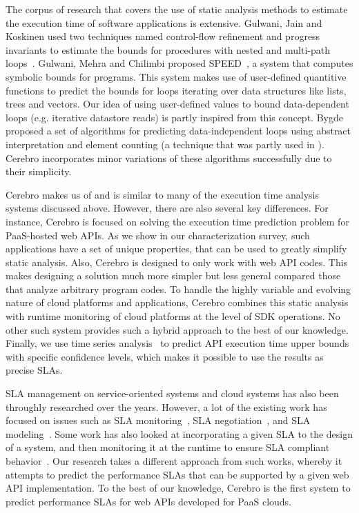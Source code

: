 The corpus of research that covers the use of static analysis methods 
to estimate the execution time of software applications is 
extensive. Gulwani, Jain and Koskinen used two techniques named control-flow
 refinement and progress invariants to estimate the bounds for procedures with nested and multi-path loops~\cite{Gulwani:2009:CRP:1542476.1542518}.
 Gulwani, Mehra and Chilimbi proposed SPEED~\cite{Gulwani:2009:SPE:1480881.1480898}, a system that computes symbolic bounds for programs. This
 system makes use of user-defined quantitive functions to predict the bounds for loops iterating over
data structures like lists, trees and vectors. Our idea of using user-defined values to bound
 data-dependent loops (e.g. iterative datastore reads) is partly inspired from this concept.
 Bygde~\cite{bygde2010static} proposed a set of algorithms for predicting data-independent loops using abstract interpretation
 and element counting (a technique that was partly used in \cite{ermedahl2007loop}). 
Cerebro incorporates minor variations of these algorithms successfully due to their
simplicity.  
 
Cerebro makes us of and is similar to many of the execution time analysis 
systems discussed above.  However, there are also several key differences. 
For instance, Cerebro is focused on solving the
execution time prediction problem for PaaS-hosted web APIs. 
As we show in our characterization survey, such applications 
have a set of unique properties, that can be used to greatly simplify static analysis.
Also, Cerebro is designed to only work with web API codes. This makes designing 
a solution much more simpler but less general compared those that analyze
arbitrary program codes.
To handle the highly variable and evolving nature of
cloud platforms and applications, Cerebro combines this static analysis with runtime
monitoring of cloud platforms at the level of SDK operations.  No other such 
system provides such a hybrid approach to the best of our knowledge. 
Finally,
we use time series analysis~\cite{Nurmi:2007:QQB:1791551.1791556} 
to predict API execution time upper bounds with specific confidence
levels, which makes it possible to use the results as precise SLAs.

SLA management on service-oriented systems and cloud systems has also been 
throughly researched
over the years. However, a lot of the existing work has focused on issues 
such as SLA monitoring~\cite{Michlmayr:2009:CQM:1657755.1657756,Tripathy:2011:MMS:1980822.1980832,Raimondi:2008:EOM:1453101.1453125,Bertolino:2007:SUS:1294904.1294914}, SLA negotiation~\cite{Mahbub:2011:PSN:2061042.2062022,Yaqub:2014:ONS:2680847.2681496,6546098}, and SLA modeling~\cite{Chau:2008:ASM:1463788.1463802,Stamou:2013:SGM:2516588.2516592,Skene:2004:PSL:998675.999422}. 
Some work has also looked at incorporating a given SLA to the design of a system, and
then monitoring it at the runtime to ensure SLA compliant behavior~\cite{He:2013:TSC:2532443.2532449}. 
Our research takes a
different approach from such works, whereby it attempts to predict the performance SLAs that can be 
supported by a given web API implementation. To the best of our knowledge, Cerebro is the first system to predict performance SLAs for web APIs developed for PaaS clouds.

